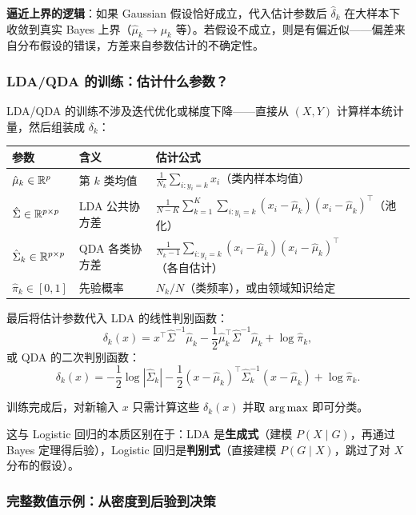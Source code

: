 \textbf{逼近上界的逻辑}：如果 Gaussian 假设恰好成立，代入估计参数后 $\hat{\delta}_k$ 在大样本下收敛到真实 Bayes 上界（$\hat{\mu}_k \to \mu_k$ 等）。若假设不成立，则是有偏近似——偏差来自分布假设的错误，方差来自参数估计的不确定性。

\subsubsection{LDA/QDA 的训练：估计什么参数？}

LDA/QDA 的训练不涉及迭代优化或梯度下降——直接从 $(X,Y)$ 计算样本统计量，然后组装成 $\delta_k$：

\begin{center}
\begin{tabular}{lll}
\toprule
参数 & 含义 & 估计公式 \\
\midrule
$\hat{\mu}_k \in \mathbb{R}^p$ & 第 $k$ 类均值 & $\displaystyle\frac{1}{N_k}\sum_{i: y_i=k} x_i$（类内样本均值） \\
$\hat{\Sigma} \in \mathbb{R}^{p\times p}$ & LDA 公共协方差 & $\displaystyle\frac{1}{N-K}\sum_{k=1}^{K}\sum_{i:y_i=k}(x_i-\hat{\mu}_k)(x_i-\hat{\mu}_k)^\top$（池化） \\
$\hat{\Sigma}_k \in \mathbb{R}^{p\times p}$ & QDA 各类协方差 & $\displaystyle\frac{1}{N_k-1}\sum_{i:y_i=k}(x_i-\hat{\mu}_k)(x_i-\hat{\mu}_k)^\top$（各自估计） \\
$\hat{\pi}_k \in [0,1]$ & 先验概率 & $N_k/N$（类频率），或由领域知识给定 \\
\bottomrule
\end{tabular}
\end{center}

最后将估计参数代入 LDA 的线性判别函数：
\[
\delta_k(x) = x^\top\hat{\Sigma}^{-1}\hat{\mu}_k - \frac12\hat{\mu}_k^\top\hat{\Sigma}^{-1}\hat{\mu}_k + \log\hat{\pi}_k,
\]
或 QDA 的二次判别函数：
\[
\delta_k(x) = -\frac12\log|\hat{\Sigma}_k| - \frac12(x-\hat{\mu}_k)^\top\hat{\Sigma}_k^{-1}(x-\hat{\mu}_k) + \log\hat{\pi}_k.
\]

训练完成后，对新输入 $x$ 只需计算这些 $\delta_k(x)$ 并取 $\arg\max$ 即可分类。

这与 Logistic 回归的本质区别在于：LDA 是\textbf{生成式}（建模 $P(X\mid G)$，再通过 Bayes 定理得后验），Logistic 回归是\textbf{判别式}（直接建模 $P(G\mid X)$，跳过了对 $X$ 分布的假设）。

\subsubsection{完整数值示例：从密度到后验到决策}

